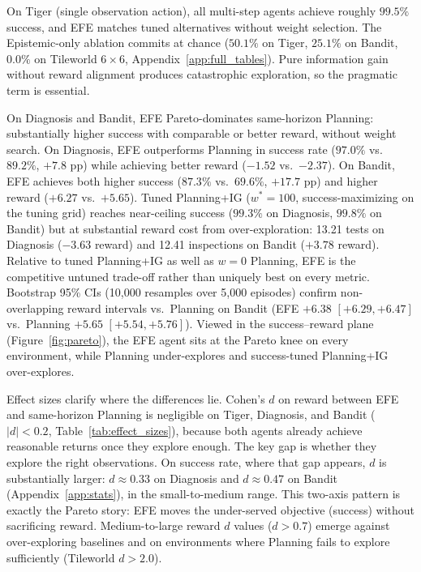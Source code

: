 \documentclass[runningheads]{llncs}
\begin{document}
On Tiger (single observation action), all multi-step agents achieve roughly $99.5\%$ success, and EFE matches tuned alternatives without weight selection. The Epistemic-only ablation commits at chance ($50.1\%$ on Tiger, $25.1\%$ on Bandit, $0.0\%$ on Tileworld $6{\times}6$, Appendix~\ref{app:full_tables}). Pure information gain without reward alignment produces catastrophic exploration, so the pragmatic term is essential.

On Diagnosis and Bandit, EFE Pareto-dominates same-horizon Planning: substantially higher success with comparable or better reward, without weight search. On Diagnosis, EFE outperforms Planning in success rate ($97.0\%$ vs.\ $89.2\%$, $+7.8$ pp) while achieving better reward ($-1.52$ vs.\ $-2.37$). On Bandit, EFE achieves both higher success ($87.3\%$ vs.\ $69.6\%$, $+17.7$ pp) and higher reward ($+6.27$ vs.\ $+5.65$). Tuned Planning+IG ($w^*{=}100$, success-maximizing on the tuning grid) reaches near-ceiling success ($99.3\%$ on Diagnosis, $99.8\%$ on Bandit) but at substantial reward cost from over-exploration: 13.21 tests on Diagnosis ($-3.63$ reward) and 12.41 inspections on Bandit ($+3.78$ reward). Relative to tuned Planning+IG as well as $w{=}0$ Planning, EFE is the competitive untuned trade-off rather than uniquely best on every metric. Bootstrap 95\% CIs (10{,}000 resamples over 5{,}000 episodes) confirm non-overlapping reward intervals vs.\ Planning on Bandit (EFE $+6.38$ $[+6.29, +6.47]$ vs.\ Planning $+5.65$ $[+5.54, +5.76]$). Viewed in the success--reward plane (Figure~\ref{fig:pareto}), the EFE agent sits at the Pareto knee on every environment, while Planning under-explores and success-tuned Planning+IG over-explores.

Effect sizes clarify where the differences lie. Cohen's $d$ on reward between EFE and same-horizon Planning is negligible on Tiger, Diagnosis, and Bandit ($|d| < 0.2$, Table~\ref{tab:effect_sizes}), because both agents already achieve reasonable returns once they explore enough. The key gap is whether they explore the right observations. On success rate, where that gap appears, $d$ is substantially larger: $d \approx 0.33$ on Diagnosis and $d \approx 0.47$ on Bandit (Appendix~\ref{app:stats}), in the small-to-medium range. This two-axis pattern is exactly the Pareto story: EFE moves the under-served objective (success) without sacrificing reward. Medium-to-large reward $d$ values ($d > 0.7$) emerge against over-exploring baselines and on environments where Planning fails to explore sufficiently (Tileworld $d > 2.0$).
\end{document}
